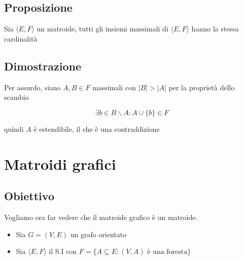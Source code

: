 \subsection{Proposizione}
Sia $\langle E,F \rangle$ un matroide, tutti gli insiemi massimali di $\langle E,F \rangle$ hanno la stessa cardinalità

\subsection{Dimostrazione}
Per assurdo, siano $A,B \in F$ massimali con $|B| > |A|$ per la proprietà dello scambio 

$$
\exists b \in B \backslash A : A \cup \{b\} \in F
$$

quindi $A$ è estendibile, il che è una contraddizione

\newpage
\section{Matroidi grafici}

\subsection{Obiettivo}
Vogliamo ora far vedere che il matroide grafico è un matroide.

\begin{itemize}
    \item Sia $G = (V,E)$ un grafo orientato
    \item Sia $\langle E,F \rangle$ il S.I con $F=\{A \subseteq E : (V,A) \text{ è una foresta}\}$
\end{itemize}

